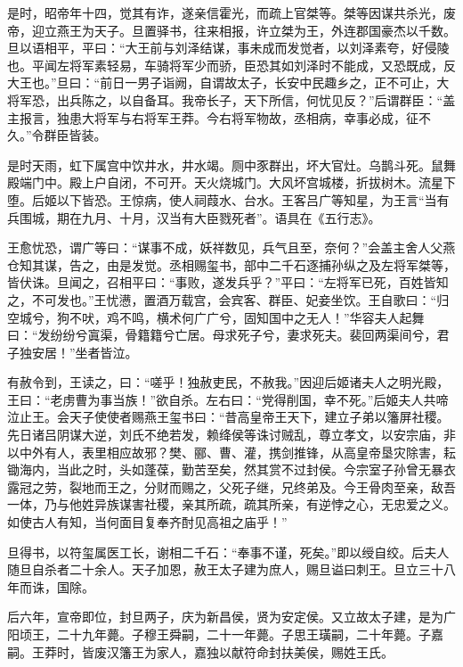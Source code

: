 \documentclass[12pt,UTF8]{ctexbook}
\begin{document}
是时，昭帝年十四，觉其有诈，遂亲信霍光，而疏上官桀等。桀等因谋共杀光，废帝，迎立燕王为天子。旦置驿书，往来相报，许立桀为王，外连郡国豪杰以千数。旦以语相平，平曰：“大王前与刘泽结谋，事未成而发觉者，以刘泽素夸，好侵陵也。平闻左将军素轻易，车骑将军少而骄，臣恐其如刘泽时不能成，又恐既成，反大王也。”旦曰：“前日一男子诣阙，自谓故太子，长安中民趣乡之，正不可止，大将军恐，出兵陈之，以自备耳。我帝长子，天下所信，何忧见反？”后谓群臣：“盖主报言，独患大将军与右将军王莽。今右将军物故，丞相病，幸事必成，征不久。”令群臣皆装。



是时天雨，虹下属宫中饮井水，井水竭。厕中豕群出，坏大官灶。乌鹊斗死。鼠舞殿端门中。殿上户自闭，不可开。天火烧城门。大风坏宫城楼，折拔树木。流星下堕。后姬以下皆恐。王惊病，使人祠葭水、台水。王客吕广等知星，为王言“当有兵围城，期在九月、十月，汉当有大臣戮死者”。语具在《五行志》。



王愈忧恐，谓广等曰：“谋事不成，妖祥数见，兵气且至，奈何？”会盖主舍人父燕仓知其谋，告之，由是发觉。丞相赐玺书，部中二千石逐捕孙纵之及左将军桀等，皆伏诛。旦闻之，召相平曰：“事败，遂发兵乎？”平曰：“左将军已死，百姓皆知之，不可发也。”王忧懑，置酒万载宫，会宾客、群臣、妃妾坐饮。王自歌曰：“归空城兮，狗不吠，鸡不鸣，横术何广广兮，固知国中之无人！”华容夫人起舞曰：“发纷纷兮寘渠，骨籍籍兮亡居。母求死子兮，妻求死夫。裴回两渠间兮，君子独安居！”坐者皆泣。



有赦令到，王读之，曰：“嗟乎！独赦吏民，不赦我。”因迎后姬诸夫人之明光殿，王曰：“老虏曹为事当族！”欲自杀。左右曰：“党得削国，幸不死。”后姬夫人共啼泣止王。会天子使使者赐燕王玺书曰：“昔高皇帝王天下，建立子弟以籓屏社稷。先日诸吕阴谋大逆，刘氏不绝若发，赖绛侯等诛讨贼乱，尊立孝文，以安宗庙，非以中外有人，表里相应故邪？樊、郦、曹、灌，携剑推锋，从高皇帝垦灾除害，耘锄海内，当此之时，头如蓬葆，勤苦至矣，然其赏不过封侯。今宗室子孙曾无暴衣露冠之劳，裂地而王之，分财而赐之，父死子继，兄终弟及。今王骨肉至亲，敌吾一体，乃与他姓异族谋害社稷，亲其所疏，疏其所亲，有逆悖之心，无忠爱之义。如使古人有知，当何面目复奉齐酎见高祖之庙乎！”



旦得书，以符玺属医工长，谢相二千石：“奉事不谨，死矣。”即以绶自绞。后夫人随旦自杀者二十余人。天子加恩，赦王太子建为庶人，赐旦谥曰刺王。旦立三十八年而诛，国除。



后六年，宣帝即位，封旦两子，庆为新昌侯，贤为安定侯。又立故太子建，是为广阳顷王，二十九年薨。子穆王舜嗣，二十一年薨。子思王璜嗣，二十年薨。子嘉嗣。王莽时，皆废汉籓王为家人，嘉独以献符命封扶美侯，赐姓王氏。
\end{document}
